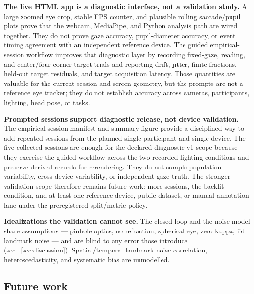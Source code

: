 \documentclass[
]{article}
\begin{document}
\textbf{The live HTML app is a diagnostic interface, not a validation
study.} A large zoomed eye crop, stable FPS counter, and plausible
rolling saccade/pupil plots prove that the webcam, MediaPipe, and Python
analysis path are wired together. They do not prove gaze accuracy,
pupil-diameter accuracy, or event timing agreement with an independent
reference device. The guided empirical-session workflow improves that
diagnostic layer by recording fixed-gaze, reading, and
center/four-corner target trials and reporting drift, jitter, finite
fractions, held-out target residuals, and target acquisition latency.
Those quantities are valuable for the current session and screen
geometry, but the prompts are not a reference eye tracker; they do not
establish accuracy across cameras, participants, lighting, head pose, or
tasks.

\textbf{Prompted sessions support diagnostic release, not device
validation.} The empirical-session manifest and summary figure provide a
disciplined way to add repeated sessions from the planned single
participant and single device. The five collected sessions are enough
for the declared diagnostic-v1 scope because they exercise the guided
workflow across the two recorded lighting conditions and preserve
derived records for rerendering. They do not sample population
variability, cross-device variability, or independent gaze truth. The
stronger validation scope therefore remains future work: more sessions,
the backlit condition, and at least one reference-device,
public-dataset, or manual-annotation lane under the preregistered
split/metric policy.

\textbf{Idealizations the validation cannot see.} The closed loop and
the noise model share assumptions --- pinhole optics, no refraction,
spherical eye, zero kappa, iid landmark noise --- and are blind to any
error those introduce (sec.~\ref{sec:discussion}). Spatial/temporal
landmark-noise correlation, heteroscedasticity, and systematic bias are
unmodelled.

\subsection{Future work}\label{future-work}
\end{document}
